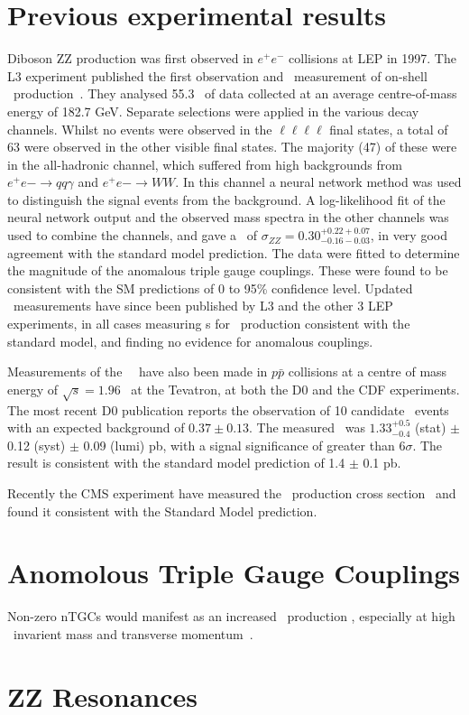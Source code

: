 \section{Previous experimental results}

Diboson ZZ production was first observed in $e^+e^-$ collisions at LEP in 1997.
The L3 experiment published the first observation and \cx\ measurement
of on-shell \ZZ\ production~\cite{Acciarri1999281}. They analysed 55.3 \ipb\
of data collected at an average centre-of-mass energy of 182.7 GeV. Separate
selections were applied in the various decay channels. Whilst no events were
observed in the $\ell\ell\ell\ell$ final states, a total of 63 were observed in
the other visible final states. The majority (47) of these were in the
all-hadronic channel, which suffered from high backgrounds from $e^+e-
\rightarrow qq \gamma$ and $e^+e- \rightarrow WW$. In this channel a neural
network method was used to distinguish the signal events from the background. A
log-likelihood fit of the neural network output and the observed mass spectra in
the other channels was used to combine the channels, and gave a \cx\ of
$\sigma_{ZZ} = 0.30^{+0.22 +0.07}_{-0.16 -0.03}$, in very good agreement with
the standard model prediction. The data were fitted to determine the magnitude
of the anomalous triple gauge couplings. These were found to be consistent with
the SM predictions of 0 to 95\% confidence level. Updated \cx\
measurements have since been published by L3 and the other 3 LEP experiments, in
all cases measuring \cx s for \ZZ\ production consistent with the
standard model, and finding no evidence for anomalous couplings.

Measurements of the \ZZ\ \cx\ have also been made in $p \bar{p}$
collisions at a centre of mass energy of $\sqrt{s} = 1.96$ \tev\ at the Tevatron, at
both the D0 and the CDF experiments. The most recent D0 publication reports the
observation of 10 candidate \ZZ\ events with an expected background of $0.37
\pm 0.13$. The measured \cx\ was $1.33^{+0.5}_{-0.4}$ (stat) $\pm$ 0.12
(syst) $\pm$ 0.09 (lumi) pb, with a signal significance of greater than
$6\sigma$. The result is consistent with the standard model prediction of 1.4
$\pm$ 0.1 pb. 

Recently the CMS experiment have measured the \ZZ\ production cross
section~\cite{CMS-PAS-EWK-11-010} and found it consistent with the Standard Model prediction.


\section{Anomolous Triple Gauge Couplings}
Non-zero nTGCs would manifest as an increased \ZZ\
production \cx, especially at high \ZZ\ invarient mass and transverse
momentum~\cite{Baur:2000ae}.

\section{ZZ Resonances}
